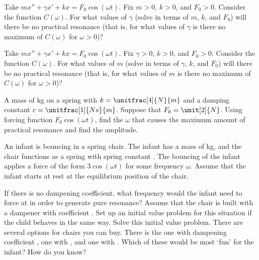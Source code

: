 \begin{exercise}
Take $m x'' + \gamma x' + kx = F_0 \cos (\omega t)$.
Fix $m > 0$, $k > 0$, and $F_0 > 0$.  Consider the function $C(\omega)$.
For what values of $\gamma$ (solve in terms of $m$, $k$, and $F_0$) will there be no
practical resonance (that is, for what values of $\gamma$ is there no maximum of
$C(\omega)$ for $\omega > 0$)?
\end{exercise}

\begin{exercise}
Take $m x'' + \gamma x' + kx = F_0 \cos (\omega t)$.
Fix $\gamma > 0$, $k > 0$, and $F_0 > 0$.  Consider the function $C(\omega)$.
For what values of $m$ (solve in terms of $\gamma$, $k$, and $F_0$) will there be no
practical resonance (that is, for what values of $m$ is there no maximum of
$C(\omega)$ for $\omega > 0$)?
\end{exercise}

\begin{exercise}\ansMark%
A mass of \unit[4]{kg} on a spring with $k=\unitfrac[4]{N}{m}$ and a damping
constant $c=\unitfrac[1]{Ns}{m}$.
Suppose that $F_0 = \unit[2]{N}$.  Using forcing function $F_0 \cos (\omega t)$,
find the $\omega$ that causes the maximum amount of practical resonance and find the amplitude.
\end{exercise}

\begin{exercise}
An infant is bouncing in a spring chair. The infant has a mass of \unit[8]{kg}, and the chair functions as a spring with spring constant . The bouncing of the infant applies a force of the form $3 \cos(\omega t)$ for some frequency $\omega$. Assume that the infant starts at rest at the equilibrium position of the chair.
\begin{tasks}
\task If there is no dampening coefficient, what frequency would the infant need to force at in order to generate pure resonance?
\task Assume that the chair is built with a dampener with coefficient . Set up an initial value problem for this situation if the child behaves in the same way.
\task Solve this initial value problem.
\task There are several options for chairs you can buy. There is the one with dampening coefficient , one with , and one with . Which of these would be most `fun' for the infant? How do you know?
\end{tasks}
\end{exercise}

